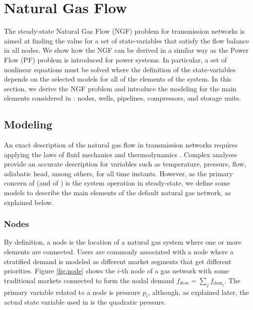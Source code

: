 \chapter{Natural Gas Flow}
\label{chap:fund_NGF}

The steady-state Natural Gas Flow (NGF) problem for transmission networks is aimed at finding the value for a set of state-variables that satisfy the flow balance in all nodes. We show how the NGF can be derived in a similar way as the Power Flow (PF) problem is introduced for power systems. In  particular, a set of nonlinear equations must be solved where the definition of the state-variables depends on the selected models for all of the elements of the system. In this section, we derive the NGF problem and introduce the modeling for the main elements considered in \mpng{}: nodes, wells, pipelines, compressors, and storage units.

\section{Modeling}
\label{sec:gas_modeling}

An exact description of the natural gas flow in transmission networks requires applying the laws of fluid mechanics and thermodynamics \cite{Osiadacz2001}. Complex analyses provide an accurate description for variables such as temperature, pressure, flow, adiabatic head, among others, for all time instants. However, as the primary concern of \matpower{} (and of \mpng{}) is the system operation in steady-state, we define some models to describe the main elements of the default natural gas network, as explained below. 

\subsection{Nodes}
\label{subsec:nodes}

By definition, a node is the location of a natural gas system where one or more elements are connected. Users are commonly associated with a node where a stratified demand is modeled as different market segments that get different priorities. Figure \ref{fig:node} shows the $i$-th node of a gas network with some traditional markets connected to form the nodal demand $f_{dem}=\sum_{j} f_{\text{dem}_j}$. The primary variable related to a node is pressure $p_i$, although, as explained later, the actual state variable used in \mpng{} is the quadratic pressure. 

